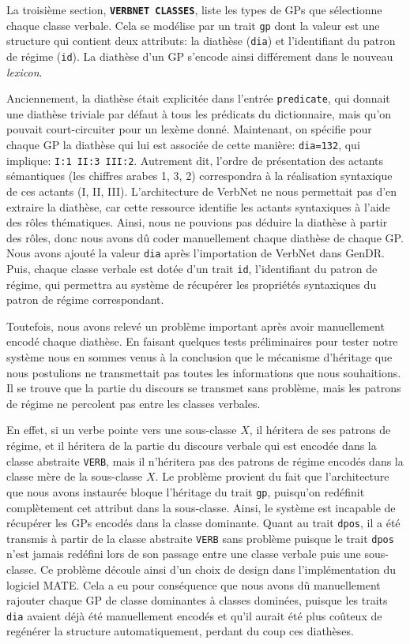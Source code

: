 La troisième section, \textbf{\texttt{VERBNET CLASSES}}, liste les types de \acp{GP} que sélectionne chaque classe verbale. Cela se modélise par un trait \texttt{gp} dont la valeur est une structure qui contient deux attributs: la diathèse (\texttt{dia}) et l'identifiant du patron de régime (\texttt{id}). La diathèse d'un \ac{GP} s'encode ainsi différement dans le nouveau \emph{lexicon}. 

Anciennement, la diathèse était explicitée dans l'entrée \texttt{predicate}, qui donnait une diathèse triviale par défaut à tous les prédicats du dictionnaire, mais qu'on pouvait court-circuiter pour un lexème donné. Maintenant, on spécifie pour chaque \ac{GP} la diathèse qui lui est associée de cette manière: \texttt{dia=132}, qui implique: \texttt{I:1 II:3 III:2}. Autrement dit, l'ordre de présentation des actants sémantiques (les chiffres arabes 1, 3, 2) correspondra à la réalisation syntaxique de ces actants (I, II, III). L'architecture de VerbNet ne nous permettait pas d'en extraire la diathèse, car cette ressource identifie les actants syntaxiques à l'aide des rôles thématiques. Ainsi, nous ne pouvions pas déduire la diathèse à partir des rôles, donc nous avons dû coder manuellement chaque diathèse de chaque \ac{GP}. Nous avons ajouté la valeur \texttt{dia} après l'importation de VerbNet dans GenDR. Puis, chaque classe verbale est dotée d'un trait \texttt{id}, l'identifiant du patron de régime, qui permettra au système de récupérer les propriétés syntaxiques du patron de régime correspondant.

Toutefois, nous avons relevé un problème important après avoir manuellement encodé chaque diathèse. En faisant quelques tests préliminaires pour tester notre système nous en sommes venus à la conclusion que le mécanisme d'héritage que nous postulions ne transmettait pas toutes les informations que nous souhaitions. Il se trouve que la partie du discours se transmet sans problème, mais les patrons de régime ne percolent pas entre les classes verbales. 

En effet, si un verbe pointe vers une sous-classe $X$, il héritera de ses patrons de régime, et il héritera de la partie du discours verbale qui est encodée dans la classe abstraite \texttt{VERB}, mais il n'héritera pas des patrons de régime encodés dans la classe mère de la sous-classe $X$. Le problème provient du fait que l'architecture que nous avons instaurée bloque l'héritage du trait \texttt{gp}, puisqu'on redéfinit complètement cet attribut dans la sous-classe. Ainsi, le système est incapable de récupérer les \acp{GP} encodés dans la classe dominante. Quant au trait \texttt{dpos}, il a été transmis à partir de la classe abstraite \texttt{VERB} sans problème puisque le trait \texttt{dpos} n'est jamais redéfini lors de son passage entre une classe verbale puis une sous-classe. Ce problème découle ainsi d'un choix de design dans l'implémentation du logiciel MATE. Cela a eu pour conséquence que nous avons dû manuellement rajouter chaque \ac{GP} de classe dominantes à classes dominées, puisque les traits \texttt{dia} avaient déjà été manuellement encodés et qu'il aurait été plus coûteux de regénérer la structure automatiquement, perdant du coup ces diathèses.

